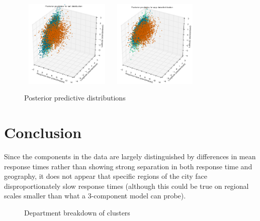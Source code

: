 \documentclass[twoside]{article}
\theoremstyle{theorem}
\theoremstyle{theorem}
\theoremstyle{theorem}
\theoremstyle{lemma}
\theoremstyle{definition}
\theoremstyle{example}
\begin{document}
\begin{figure}[h!]
\begin{center}
\includegraphics[width=45mm, height=42mm]{callposteriorpredictive}
\includegraphics[width=45mm, height=42mm]{appposteriorpredictive}
\caption{Posterior predictive distributions}
\label{pred}
\end{center}
\end{figure}

\section{Conclusion}

Since the components in the data are largely distinguished by differences in mean response times rather than showing strong separation in both response time and geography, it does not appear that specific regions of the city face disproportionately slow response times (although this could be true on regional scales smaller than what a 3-component model can probe). 

\begin{figure}[h!]
\begin{center}
\caption{Department breakdown of clusters}
\hskip1cm
\end{center}\label{fig:conv}
\vskip -0.2in
\end{figure} 
\end{document}
